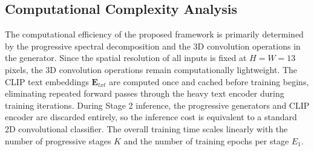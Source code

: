 \subsection{Computational Complexity Analysis}
The computational efficiency of the proposed framework is primarily determined by the progressive spectral decomposition and the 3D convolution operations in the generator. Since the spatial resolution of all inputs is fixed at $H = W = 13$ pixels, the 3D convolution operations remain computationally lightweight. The CLIP text embeddings $\mathbf{E}_{txt}$ are computed once and cached before training begins, eliminating repeated forward passes through the heavy text encoder during training iterations. During Stage 2 inference, the progressive generators and CLIP encoder are discarded entirely, so the inference cost is equivalent to a standard 2D convolutional classifier. The overall training time scales linearly with the number of progressive stages $K$ and the number of training epochs per stage $E_1$.

